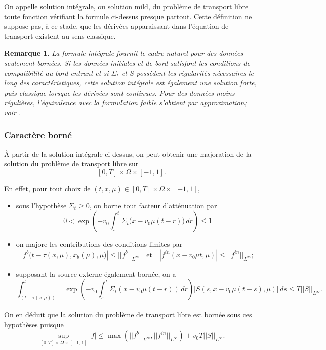 \documentclass{article}
\newtheorem{remark}[theorem]{Remarque}
\begin{document}
On appelle solution intégrale, ou solution mild, du problème de transport libre toute fonction vérifiant la formule ci-dessus presque partout. Cette définition ne suppose pas, à ce stade, que les dérivées apparaissant dans l'équation de transport existent au sens classique. 

\begin{remark}
La formule intégrale fournit le cadre naturel pour des données seulement bornées. Si les données initiales et de bord satisfont les conditions de compatibilité au bord entrant et si $\Sigma_t$ et $S$ possèdent les régularités nécessaires le long des caractéristiques, cette solution intégrale est également une solution forte, puis classique lorsque les dérivées sont continues. Pour des données moins régulières, l'équivalence avec la formulation faible s'obtient par approximation; voir \cite[chap.~2, section~2.3]{Allaire2018}.
\end{remark}

\subsubsection{Caractère borné}

À partir de la solution intégrale ci-dessus, on peut obtenir une majoration de la solution du problème de transport libre sur
\[
[0,T]\times\Omega\times[-1,1].
\]

En effet, pour tout choix de \((t,x,\mu)\in[0,T]\times\Omega\times[-1,1],\)
\begin{itemize}
    \item sous l’hypothèse $\Sigma_t\geq0$, on borne tout facteur d’atténuation par
\[
0 < \exp\!\left(-v_0\int_s^t\Sigma_t\bigl(x-v_0\mu(t-r)\bigr)\,dr\right) \leq 1
\]

    \item on majore les contributions des conditions limites par
    \[ \left| f^b\bigl(t-\tau(x,\mu),x_b(\mu),\mu\bigr) \right| \leq ||f^b||_{L^\infty}
    \quad \text{et} \quad
    |f^{in}(x-v_0\mu t,\mu)| \leq ||f^{in}||_{L^\infty};
    \]

\item supposant la source externe également bornée, on a    
    \[ 
    \int_{(t-\tau(x,\mu))_+}^t \exp\!\left(-v_0\int_s^t\Sigma_t(x-v_0\mu(t-r))\,dr\right) \left| S(s,x-v_0\mu(t-s),\mu) \right| \,ds
    \leq T||S||_{L^\infty}.
    \]
\end{itemize}

On en déduit que la solution du problème de transport libre est bornée sous ces hypothèses puisque
\begin{equation}
    \sup_{[0,T]\times\Omega\times[-1,1]} |f|
    \leq \max\left(||f^b||_{L^\infty},||f^{in}||_{L^\infty}\right)
    +v_0T||S||_{L^\infty}.
\end{equation}
\end{document}
